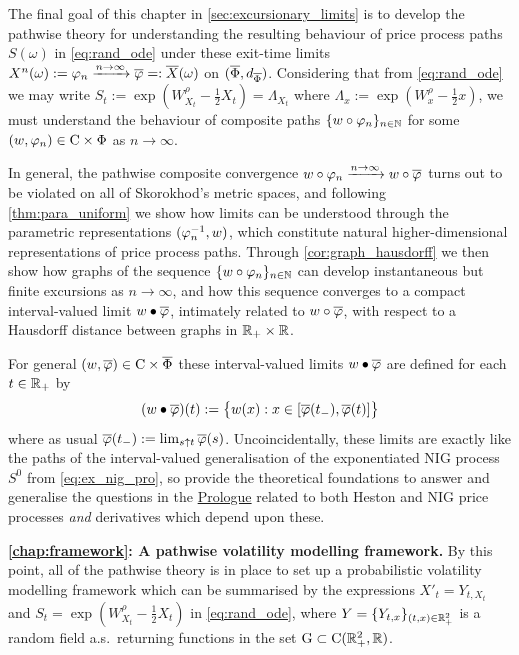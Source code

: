 The final goal of this chapter in \autoref{sec:excursionary_limits} is to develop the pathwise theory for understanding the resulting behaviour of price process paths $S(\omega)$ in \autoref{eq:rand_ode} under these exit-time limits $X^n(\omega) := \varphi_n\xrightarrow{n\to\infty}\overline{\varphi} =: {\overline{X}}(\omega)$ on $(\overline{\Phi},d_{\overline{\Phi}})$. Considering that from \autoref{eq:rand_ode} we may write $S_t := \exp(W^\rho_{X_t}-\frac12 X_t) = \Lambda_{X_t}$ where $\Lambda_x:=\exp(W^\rho_x-\frac12 x)$, we must understand the behaviour of composite paths $\{w\circ\varphi_n\}_{n\in\mathbb{N}}$ for some $(w,\varphi_n)\in\mathrm{C}\times\Phi$ as $n\to\infty$.

In general, the pathwise composite convergence $w\circ\varphi_n\xrightarrow{n\to\infty}w\circ\overline{\varphi}$ turns out to be violated on all of Skorokhod's metric spaces, and following \autoref{thm:para_uniform} we show how limits can be understood through the parametric representations $(\varphi_n^{-1},w)$, which constitute natural higher-dimensional representations of price process paths. Through \autoref{cor:graph_hausdorff} we then show how graphs of the sequence $\{w\circ\varphi_n\}_{n\in\mathbb{N}}$ can develop instantaneous but finite excursions as $n\to\infty$, and how this sequence converges to a compact interval-valued limit $w\bullet\overline{\varphi}$, intimately related to $w\circ\overline{\varphi}$, with respect to a Hausdorff distance between graphs in $\mathbb{R}_+\times\mathbb{R}$.

For general $(w,\overline{\varphi})\in\mathrm{C}\times\overline{\Phi}$ these interval-valued limits $w\bullet\overline{\varphi}$ are defined for each $t\in\mathbb{R}_+$ by
\begin{equation}\label{eq:excursion_path}
    (w\bullet\overline{\varphi})(t) := \big\{w(x):x\in[\overline{\varphi}(t_-),\overline{\varphi}(t)]\big\}
\end{equation}
where as usual $\overline{\varphi}(t_-):=\lim_{s\uparrow t}\overline{\varphi}(s)$. Uncoincidentally, these limits are exactly like the paths of the interval-valued generalisation of the exponentiated NIG process $S^0$ from \autoref{eq:ex_nig_pro}, so provide the theoretical foundations to answer and generalise the questions in the \hyperlink{prologue}{Prologue} related to both Heston and NIG price processes \emph{and} derivatives which depend upon these.

\vspace{3mm}\textbf{\autoref{chap:framework}: A pathwise volatility modelling framework.} By this point, all of the pathwise theory is in place to set up a probabilistic volatility modelling framework which can be summarised by the expressions $X'_t = Y_{t,X_t}$ and $S_t = \exp\left(W^\rho_{X_t} - \tfrac12 X_t\right)$ in \autoref{eq:rand_ode}, where $Y=\{Y_{t,x}\}_{(t,x)\in\mathbb{R}_+^2}$ is a random field a.s.~returning functions in the set $\mathrm{G}\subset\mathrm{C}(\mathbb{R}_+^2,\mathbb{R})$.

